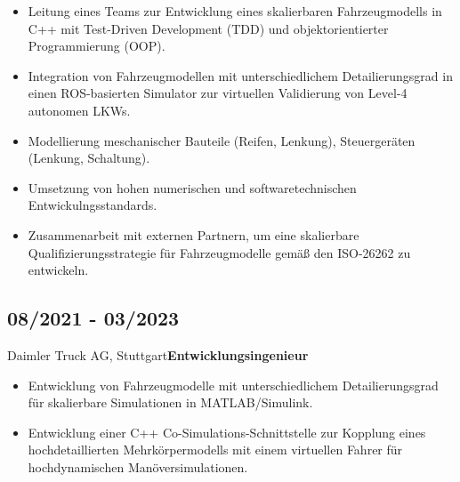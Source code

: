 \documentclass{mycv}
\begin{document}
\begin{paracol}{2}
{\begin{itemize}
            \item Leitung eines Teams zur Entwicklung eines skalierbaren
                Fahrzeugmodells in C++ mit Test-Driven Development (TDD) und
                objektorientierter Programmierung (OOP).

            \item Integration von Fahrzeugmodellen mit unterschiedlichem
                Detailierungsgrad in einen ROS-basierten Simulator zur
                virtuellen Validierung von Level-4 autonomen LKWs.
            
            \item Modellierung meschanischer Bauteile (Reifen, Lenkung),
                Steuerger{\"a}ten (Lenkung, Schaltung).

            \item Umsetzung von hohen numerischen und softwaretechnischen
                Entwickulngsstandards. 

            \item Zusammenarbeit mit externen Partnern, um eine skalierbare
                Qualifizierungsstrategie für Fahrzeugmodelle gem{\"a}{\ss} den
                ISO-26262 zu entwickeln.

          \end{itemize}
     
          \subsection{08/2021 - 03/2023}{Daimler Truck AG, Stuttgart}{{\bfseries Entwicklungsingenieur}}
           \begin{itemize}
               \item Entwicklung von Fahrzeugmodelle mit unterschiedlichem
                   Detailierungsgrad f{\"u}r skalierbare Simulationen in MATLAB/Simulink.

               \item Entwicklung einer C++ Co-Simulations-Schnittstelle zur
                   Kopplung eines hochdetaillierten Mehrk{\"o}rpermodells mit
                   einem virtuellen Fahrer für hochdynamischen
                   Man{\"o}versimulationen.
           \end{itemize}

}
\end{paracol}
\end{document}

